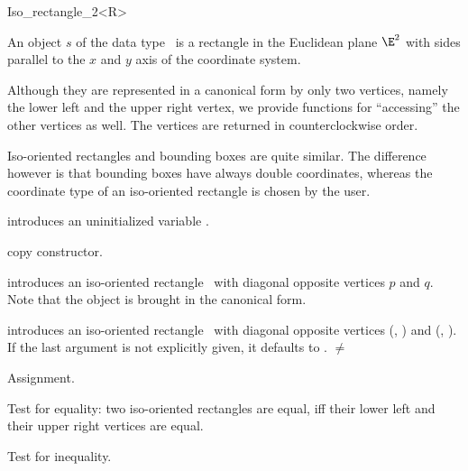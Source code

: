 \begin{ccRefClass} {Iso_rectangle_2<R>}

\ccDefinition  An object $s$ of the data type \ccRefName\ is a
rectangle in the Euclidean plane $\E^2$ with sides parallel to the $x$ and
$y$ axis of the coordinate system.
 
Although they are represented in a canonical form by only two
vertices, namely the lower left and the upper right vertex, we provide
functions for ``accessing'' the other vertices as well. The vertices
are returned in counterclockwise order.

Iso-oriented rectangles and bounding boxes are quite similar. The
difference however is that bounding boxes have always double coordinates, 
whereas the coordinate type of an iso-oriented rectangle is chosen by
the user.

\ccCreation
{}


\ccHidden {}
             {introduces an uninitialized variable \ccVar.}

\ccHidden {}
 	    {copy constructor.}

            {introduces an iso-oriented rectangle \ccVar\ with diagonal
             opposite vertices $p$ and $q$. Note that the object is 
             brought in the canonical form.}

            {introduces an iso-oriented rectangle \ccVar\ with diagonal
             opposite vertices (, ) and 
             (, ).  If the last argument 
             is not explicitly given, it defaults to .
             \ccPrecond {} $\neq$  }

\ccOperations
\ccHidden {}
        {Assignment.}

       {Test for equality: two iso-oriented rectangles are equal, iff their
        lower left and their upper right vertices are equal.}

       {Test for inequality.}


\end{ccRefClass}
